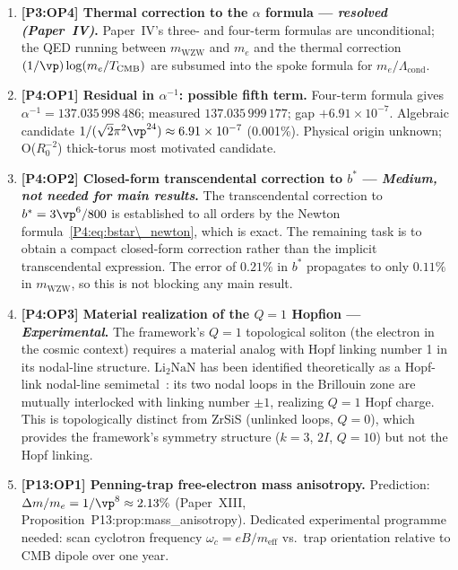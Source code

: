 \begin{enumerate}[label=,leftmargin=*]
\item \textbf{[P3:OP4] Thermal correction to the $\alpha$ formula --- \emph{resolved (Paper~IV)}.}
Paper~IV's three- and four-term formulas are unconditional; the QED running
between $m_{\mathrm{WZW}}$ and $m_e$ and the thermal correction
$(1/\vp)\log(m_e/T_{\mathrm{CMB}})$ are subsumed into the spoke formula for
$m_e/\Lambda_{\mathrm{cond}}$.

\item \textbf{[P4:OP1] Residual in $\alpha^{-1}$: possible fifth term.}
Four-term formula gives $\alpha^{-1}=137.035\,998\,486$;
measured $137.035\,999\,177$; gap $+6.91\times10^{-7}$.
Algebraic candidate $1/(\sqrt{2}\pi^2\vp^{24})\approx6.91\times10^{-7}$ (0.001\%).
Physical origin unknown; O($R_0^{-2}$) thick-torus most motivated candidate.

\item \textbf{[P4:OP2] Closed-form transcendental correction to $b^*$ --- \emph{Medium, not needed for main results}.}
The transcendental correction to $b^*=3\vp^6/800$ is established to all
orders by the Newton formula~\eqref{P4:eq:bstar\_newton}, which is exact.
The remaining task is to obtain a compact closed-form correction rather
than the implicit transcendental expression. The error of $0.21\%$ in
$b^*$ propagates to only $0.11\%$ in $m_{\mathrm{WZW}}$, so this is not
blocking any main result.

\item \textbf{[P4:OP3] Material realization of the $Q=1$ Hopfion --- \emph{Experimental}.}
The framework's $Q=1$ topological soliton (the electron in the cosmic
context) requires a material analog with Hopf linking number 1 in its
nodal-line structure. $\mathrm{Li_2NaN}$ has been identified theoretically
as a Hopf-link nodal-line semimetal~\cite{Li2NaN2017,Li2NaN2018}: its two
nodal loops in the Brillouin zone are mutually interlocked with linking
number $\pm1$, realizing $Q=1$ Hopf charge. This is topologically distinct
from ZrSiS (unlinked loops, $Q=0$), which provides the framework's symmetry
structure ($k=3$, $2I$, $Q=10$) but not the Hopf linking.

\item \textbf{[P13:OP1] Penning-trap free-electron mass anisotropy.}
Prediction: $\Delta m/m_e=1/\vp^8\approx2.13\%$ (Paper~XIII,
Proposition~P13:prop:mass\_anisotropy). Dedicated experimental programme needed:
scan cyclotron frequency $\omega_c=eB/m_\mathrm{eff}$ vs.\ trap orientation
relative to CMB dipole over one year.


\end{enumerate}
